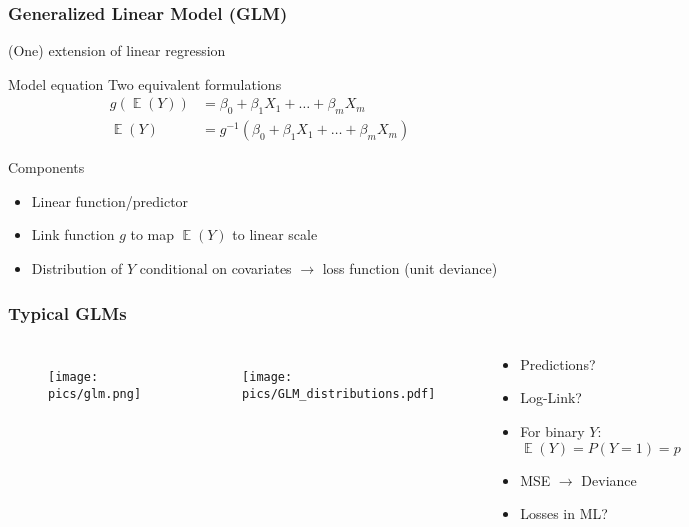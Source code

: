 \documentclass[
    utf8,
    aspectratio=169
]{beamer}  %
\DeclareMathOperator{\E}{\mathbb{E}}  %
\begin{document}
\begin{frame}
	\frametitle{Generalized Linear Model (GLM)}
	\begin{block}{(One) extension of linear regression}
	\end{block}
	
	\begin{block}{Model equation}
		Two equivalent formulations
		\begin{align*}
			g(\E(Y)) &= \beta_0 + \beta_1 X_1 + \dots + \beta_m X_m \\
			\E(Y) &= g^{-1}(\beta_0 + \beta_1 X_1 + \dots + \beta_m X_m)
		\end{align*}
	\end{block}
	
	\begin{block}{Components}
		\begin{itemize}
			\item Linear function/predictor
			\item Link function $g$ to map $\E(Y)$ to linear scale
			\item Distribution of $Y$ conditional on covariates $\rightarrow$ loss function (unit deviance)
		\end{itemize}
	\end{block}
\end{frame}

\begin{frame}
	\frametitle{Typical GLMs}
	\begin{columns}[onlytextwidth]
		\begin{figure}
			\texttt{[image: pics/glm.png]}
		\end{figure}
		\begin{figure}
			\texttt{[image: pics/GLM\_distributions.pdf]}
		\end{figure}
		\begin{footnotesize}
			\begin{itemize}
				\itemsep0em 
				\item Predictions?
				\item Log-Link?
				\item For binary $Y$:
				$\E(Y) = P(Y = 1) = p$
				\item MSE $\rightarrow$ Deviance
				\item Losses in ML?
			\end{itemize}
		\end{footnotesize}
	\end{columns}
\end{frame}
\end{document}
